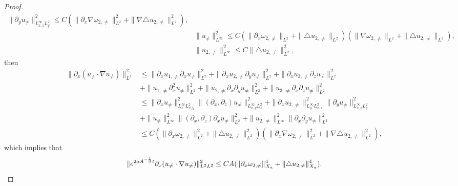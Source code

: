 \documentclass[12pt, reqno]{amsart}
\numberwithin{equation}{section}
\begin{document}
\begin{proof}
\begin{equation}
\begin{aligned}
				\|\partial_y u_{\neq}\|_{L^{\infty}_{x,z}L^2_{y}}^2\leq 
				C(\|\partial_x\nabla\omega_{2,\neq}\|^2_{L^2}+\|\nabla\triangle u_{2,\neq}\|^2_{L^2}),\\
				&\|u_{\neq}\|_{L^{\infty}}^2\leq C(\|\partial_x\omega_{2,\neq}\|_{L^2}+\|\triangle u_{2,\neq}\|_{L^2})(\|\nabla\omega_{2,\neq}\|_{L^2}+\|\triangle u_{2,\neq}\|_{L^2}),\\
				&\|u_{2,\neq}\|_{L^{\infty}}^2\leq C\|\triangle u_{2,\neq}\|_{L^2}^2,
			\end{aligned}
		\end{equation}
		then
		\begin{equation*}
			\begin{aligned}
				\|\partial_x(u_{\neq}\cdot\nabla u_{\neq})\|^2_{L^2}
				&\leq 
				\|\partial_xu_{1,\neq}\partial_x u_{\neq}\|_{L^2}^2+
				\|\partial_xu_{2,\neq}\partial_y u_{\neq}\|_{L^2}^2+
				\|\partial_xu_{3,\neq}\partial_z u_{\neq}\|_{L^2}^2\\
				&+\|u_{1,\neq}\partial_x^2 u_{\neq}\|_{L^2}^2+
				\|u_{2,\neq}\partial_x\partial_y u_{\neq}\|_{L^2}^2+
				\|u_{3,\neq}\partial_x\partial_z u_{\neq}\|_{L^2}^2\\
				&\leq \|\partial_xu_{\neq}\|_{L^{\infty}_{z}L^2_{x,y}}^2
				\|(\partial_x,\partial_z)u_{\neq}\|_{L^{\infty}_{x,y}L^2_{z}}^2+
				\|\partial_xu_{2,\neq}\|_{L^{\infty}_{y}L^2_{x,z}}^2\|\partial_y u_{\neq}\|_{L^{\infty}_{x,z}L^2_{y}}^2\\
				&+ \|u_{\neq}\|_{L^{\infty}}^2
				\|(\partial_x,\partial_z)\partial_x u_{\neq}\|_{L^2}^2+
				\|u_{2,\neq}\|_{L^{\infty}}^2
				\|\partial_x\partial_y u_{\neq}\|_{L^2}^2\\
				&\leq C(\|\partial_x\omega_{2,\neq}\|^2_{L^2}+\|\triangle u_{2,\neq}\|_{L^2}^2)(\|\partial_x\nabla\omega_{2,\neq}\|^2_{L^2}
				+\|\nabla\triangle u_{2,\neq}\|^2_{L^2}),
			\end{aligned}
		\end{equation*}
		which implies that 
		$$\|{\rm e}^{2aA^{-\frac{1}{3}}t}\partial_x(u_{\neq}\cdot\nabla u_{\neq})\|^2_{L^2L^2}
		\leq CA(\|\partial_x\omega_{2,\neq}\|^4_{X_a}
		+\|\triangle u_{2,\neq}\|^4_{X_a}).$$
		

\end{proof}
\end{document}
